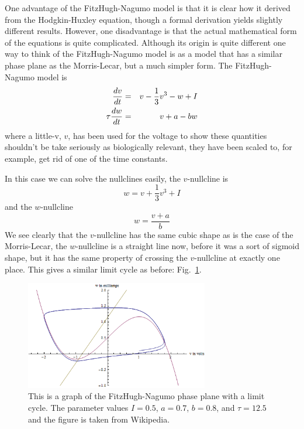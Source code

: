 \documentclass[11pt,a4paper]{scrartcl}
\begin{document}
One advantage of the FitzHugh-Nagumo model
\cite{FitzHugh1955,Nagumo1962} is that it is clear how it derived from
the Hodgkin-Huxley equation, though a formal derivation yields
slightly different results. However, one disadvantage is that the
actual mathematical form of the equations is quite
complicated. Although its origin is quite different one way to think
of the FitzHugh-Nagumo model is as a model that has a similar phase
plane as the Morris-Lecar, but a much simpler form. The
FitzHugh-Nagumo model is
\begin{eqnarray}
\frac{dv}{dt}&=&v-\frac{1}{3}v^3-w+I\cr
\tau\frac{dw}{dt}&=&v+a-bw
\end{eqnarray}
where a little-v, $v$, has been used for the voltage to show these
quantities shouldn't be take seriously as biologically relevant, they
have been scaled to, for example, get rid of one of the time
constants. 

In this case we can solve the nullclines easily, the $v$-nullcline is
\begin{equation}
w=v+\frac{1}{3}v^3+I
\end{equation}
and the $w$-nullcline
\begin{equation}
w=\frac{v+a}{b}
\end{equation}
We see clearly that the $v$-nullcline has the same cubic shape as is
the case of the Morris-Lecar, the $w$-nullcline is a straight line
now, before it was a sort of sigmoid shape, but it has the same
property of crossing the $v$-nullcline at exactly one place. This gives a similar limit cycle as before: Fig.~\ref{FHN_phase}.

\begin{figure}
\begin{center}
\includegraphics[width=8cm]{FHN_phase.png}
\end{center}
\caption{This is a graph of the FitzHugh-Nagumo phase plane with a limit cycle. The parameter values $I=0.5$, $a=0.7$, $b=0.8$, and $\tau=12.5$ and the figure is taken from Wikipedia.\label{FHN_phase}}
\end{figure}
\end{document}
